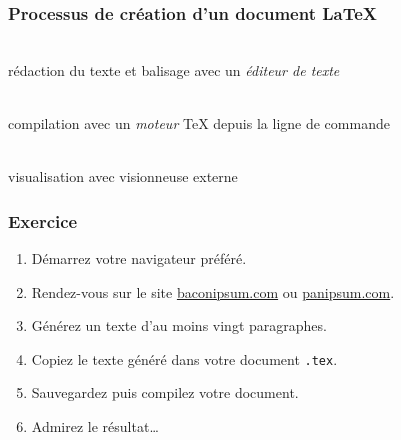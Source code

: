 
\begin{frame}[c]
	\frametitle{Processus de création d'un document {\LaTeX}}
	\Huge
	\begin{minipage}[t]{0.25\linewidth}
		\centering
		\faFileTextO \\ \bigskip
		\footnotesize
		rédaction du texte et balisage avec un \emph{éditeur de texte}
	\end{minipage}
	\hfill\faArrowRight\hfill
	\begin{minipage}[t]{0.25\linewidth}
		\centering
		\faCogs \\  \bigskip
		\footnotesize
		compilation avec un \emph{moteur} {\TeX} depuis la ligne de commande
	\end{minipage}
	\hfill\faArrowRight\hfill
	\begin{minipage}[t]{0.25\linewidth}
		\centering
		\faFilePdfO \\  \bigskip
		\footnotesize
		visualisation avec visionneuse externe
	\end{minipage}
	
\end{frame}


\begin{frame}[c]

\frametitle{Exercice \thenoExercice}

\begin{enumerate}
	\item Démarrez votre navigateur préféré.
	\item Rendez-vous sur le site \href{https://baconipsum.com/}{baconipsum.com} ou %
		\href{http://panipsum.com/}{panipsum.com}.
	\item Générez un texte d'au moins vingt paragraphes.
	\item Copiez le texte généré dans votre document \texttt{.tex}.
	\item Sauvegardez puis compilez votre document.
	\item Admirez le résultat\ldots
\end{enumerate}

\end{frame}


